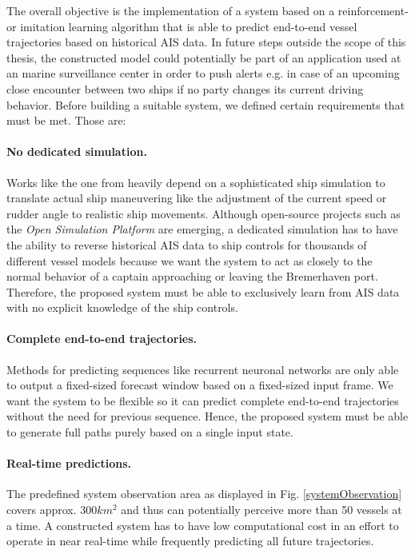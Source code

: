 The overall objective is the implementation of a system based on a reinforcement- or imitation learning algorithm that is able to predict end-to-end vessel trajectories based on historical AIS data. In future steps outside the scope of this thesis, the constructed model could potentially be part of an application used at an marine surveillance center in order to push alerts e.g. in case of an upcoming close encounter between two ships if no party changes its current driving behavior. Before building a suitable system, we defined certain requirements that must be met. Those are:
\paragraph{No dedicated simulation.} Works like the one from \cite{westerlund2021learning} heavily depend on a sophisticated ship simulation to translate actual ship maneuvering like the adjustment of the current speed or rudder angle to realistic ship movements. Although open-source projects such as the \textit{Open Simulation Platform} \cite[]{smogeli2020open} are emerging, a dedicated simulation has to have the ability to reverse historical AIS data to ship controls for thousands of different vessel models because we want the system to act as closely to the normal behavior of a captain approaching or leaving the Bremerhaven port. Therefore, the proposed system must be able to exclusively learn from AIS data with no explicit knowledge of the ship controls.

\paragraph{Complete end-to-end trajectories.}
Methods for predicting sequences like recurrent neuronal networks are only able to output a fixed-sized forecast window based on a fixed-sized input frame. We want the system to be flexible so it can predict complete end-to-end trajectories without the need for previous sequence. Hence, the proposed system must be able to generate full paths purely based on a single input state.

\paragraph{Real-time predictions.} The predefined system observation area as displayed in Fig. \ref{systemObservation} covers approx. $300 km^2$ and thus can potentially perceive more than 50 vessels at a time. A constructed system has to have low computational cost in an effort to operate in near real-time while frequently predicting all future trajectories.


